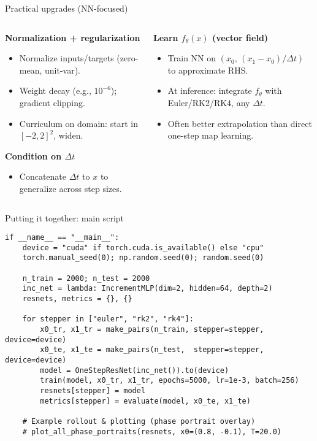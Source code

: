 \documentclass[aspectratio=169]{beamer}
\begin{document}
\begin{frame}[fragile]{Practical upgrades (NN-focused)}
\begin{columns}[T,totalwidth=\textwidth]
\begin{column}{0.52\textwidth}
\textbf{Normalization + regularization}
\begin{itemize}
  \item Normalize inputs/targets (zero-mean, unit-var).
  \item Weight decay (e.g., $10^{-6}$); gradient clipping.
  \item Curriculum on domain: start in $[-2,2]^2$, widen.
\end{itemize}
\vspace{0.6ex}
\textbf{Condition on $\Delta t$}
\begin{itemize}
  \item Concatenate $\Delta t$ to $x$ to generalize across step sizes.
\end{itemize}
\end{column}
\begin{column}{0.48\textwidth}
\textbf{Learn $f_\theta(x)$ (vector field)}
\begin{itemize}
  \item Train NN on $(x_0,\,(x_1-x_0)/\Delta t)$ to approximate RHS.
  \item At inference: integrate $f_\theta$ with Euler/RK2/RK4, any $\Delta t$.
  \item Often better extrapolation than direct one-step map learning.
\end{itemize}
\end{column}
\end{columns}
\end{frame}

\begin{frame}[fragile]{Putting it together: main script}
\begin{lstlisting}[style=py,caption={Train per stepper and plot},label={lst:main}]
if __name__ == "__main__":
    device = "cuda" if torch.cuda.is_available() else "cpu"
    torch.manual_seed(0); np.random.seed(0); random.seed(0)

    n_train = 2000; n_test = 2000
    inc_net = lambda: IncrementMLP(dim=2, hidden=64, depth=2)
    resnets, metrics = {}, {}

    for stepper in ["euler", "rk2", "rk4"]:
        x0_tr, x1_tr = make_pairs(n_train, stepper=stepper, device=device)
        x0_te, x1_te = make_pairs(n_test,  stepper=stepper, device=device)
        model = OneStepResNet(inc_net()).to(device)
        train(model, x0_tr, x1_tr, epochs=5000, lr=1e-3, batch=256)
        resnets[stepper] = model
        metrics[stepper] = evaluate(model, x0_te, x1_te)

    # Example rollout & plotting (phase portrait overlay)
    # plot_all_phase_portraits(resnets, x0=(0.8, -0.1), T=20.0)
\end{lstlisting}
\end{frame}
\end{document}

